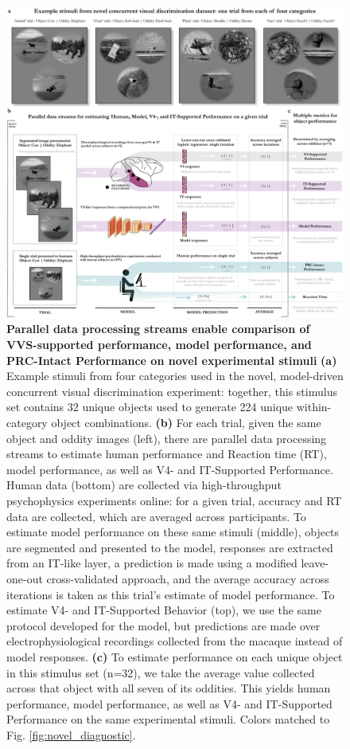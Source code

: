 \documentclass[11pt]{article}
\begin{document}
\begin{figure}[ht]
\centering
\includegraphics[width=\linewidth]{figures/F4}
\caption{\textbf{Parallel data processing streams enable comparison of VVS-supported performance, model performance, and PRC-Intact Performance on novel experimental stimuli} \textbf{(a)} Example stimuli from four categories used in the novel, model-driven concurrent visual discrimination experiment: together, this stimulus set contains 32 unique objects used to generate 224 unique within-category object combinations. \textbf{(b)} For each trial, given the same object and oddity images (left), there are parallel data processing streams to estimate human performance and Reaction time (RT), model performance, as well as V4- and IT-Supported Performance. Human data (bottom) are collected via high-throughput psychophysics experiments online: for a given trial, accuracy and RT data are collected, which are averaged across participants. To estimate model performance on these same stimuli (middle), objects are segmented and presented to the model, responses are extracted from an IT-like layer, a prediction is made using a modified leave-one-out cross-validated approach, and the average accuracy across iterations is taken as this trial's estimate of model performance. To estimate V4- and IT-Supported Behavior (top), we use the same protocol developed for the model, but predictions are made over electrophysiological recordings collected from the macaque\cite{majaj2015simple} instead of model responses. \textbf{(c)} To estimate performance on each unique object in this stimulus set (n=32), we take the average value collected across that object with all seven of its oddities. This yields human performance, model performance, as well as V4- and IT-Supported Performance on the same experimental stimuli. Colors matched to Fig. \ref{fig:novel_diagnostic}.}
\label{fig:novel_protocol_flow}
\end{figure}
\end{document}
